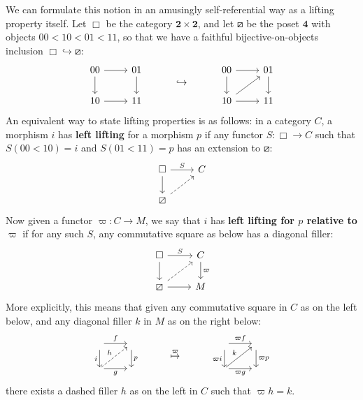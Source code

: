 \documentclass[10pt]{article}
\theoremstyle{definition}
\newcommand\vp{\varpi}
\begin{document}
We can formulate this notion in an amusingly self-referential way as a lifting property itself.
Let $\Box$ be the category $\mathbf{2}\times \mathbf{2}$, and let $\boxslash$ be the poset $\mathbf{4}$ with objects $00 < 10 < 01 < 11$, so that we have a faithful bijective-on-objects inclusion $\Box \hookrightarrow \boxslash$:
\[
  \begin{tikzcd}
    00 \ar[d] \ar[r] & 01 \ar[d] \\
    10 \ar[r] & 11
  \end{tikzcd}
  \hspace{1cm}\hookrightarrow\hspace{1cm}
  \begin{tikzcd}
    00 \ar[d] \ar[r] & 01 \ar[d] \\
    10 \ar[r] \ar[ur] & 11
  \end{tikzcd}
\]
An equivalent way to state lifting properties is as follows: in a category $C$, a morphism $i$ has \textbf{left lifting} for a morphism $p$ if any functor $S:\Box\to C$ such that $S(00<10)=i$ and $S(01<11)=p$ has an extension to $\boxslash$:
\[
  \begin{tikzcd}
    \Box \ar[r,"S"] \ar[d] & C \\
    \boxslash \ar[ur,dashed]
  \end{tikzcd}
\]
Now given a functor $\vp:C\to M$, we say that $i$ has \textbf{left lifting for $p$ relative to $\vp$} if for any such $S$, any commutative square as below has a diagonal filler:
\[
  \begin{tikzcd}
    \Box \ar[r,"S"] \ar[d] & C \ar[d,"\vp"] \\
    \boxslash \ar[ur,dashed] \ar[r] & M
  \end{tikzcd}
\]
More explicitly, this means that given any commutative square in $C$ as on the left below, and any diagonal filler $k$ in $M$ as on the right below:
\[
  \begin{tikzcd}
    {}\ar[d,"i"'] \ar[r,"f"] &{}\ar[d,"p"]\\
    {}\ar[r,"g"'] \ar[ur,dashed,"h"] & {}
  \end{tikzcd}
  \hspace{1cm}\overset{\vp}{\mapsto}\hspace{1cm}
  \begin{tikzcd}
    {}\ar[d,"\vp i"'] \ar[r,"\vp f"] &{}\ar[d,"\vp p"]\\
    {}\ar[r,"\vp g"'] \ar[ur,"k"] & {}
  \end{tikzcd}
\]
there exists a dashed filler $h$ as on the left in $C$ such that $\vp h = k$.
\end{document}
